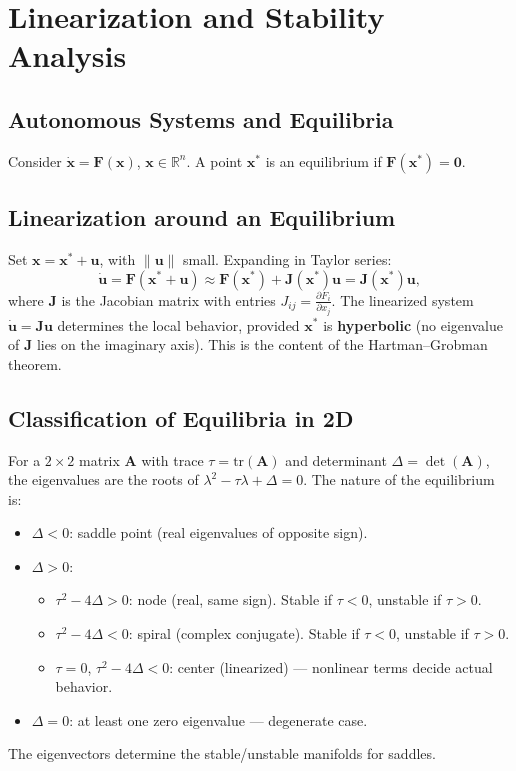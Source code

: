 \documentclass[12pt,a4paper]{book}
\begin{document}
\section{Linearization and Stability Analysis}

\subsection{Autonomous Systems and Equilibria}
Consider $\dot{\mathbf{x}} = \mathbf{F}(\mathbf{x})$, $\mathbf{x}\in\mathbb{R}^n$. A point $\mathbf{x}^*$ is an equilibrium if $\mathbf{F}(\mathbf{x}^*) = \mathbf{0}$.

\subsection{Linearization around an Equilibrium}
Set $\mathbf{x} = \mathbf{x}^* + \mathbf{u}$, with $\|\mathbf{u}\|$ small. Expanding in Taylor series:
\[
\dot{\mathbf{u}} = \mathbf{F}(\mathbf{x}^* + \mathbf{u}) \approx \mathbf{F}(\mathbf{x}^*) + \mathbf{J}(\mathbf{x}^*) \mathbf{u} = \mathbf{J}(\mathbf{x}^*) \mathbf{u},
\]
where $\mathbf{J}$ is the Jacobian matrix with entries $J_{ij} = \frac{\partial F_i}{\partial x_j}$. The linearized system $\dot{\mathbf{u}} = \mathbf{J}\mathbf{u}$ determines the local behavior, provided $\mathbf{x}^*$ is \textbf{hyperbolic} (no eigenvalue of $\mathbf{J}$ lies on the imaginary axis). This is the content of the Hartman–Grobman theorem.

\subsection{Classification of Equilibria in 2D}
For a $2\times2$ matrix $\mathbf{A}$ with trace $\tau = \text{tr}(\mathbf{A})$ and determinant $\Delta = \det(\mathbf{A})$, the eigenvalues are the roots of $\lambda^2 - \tau\lambda + \Delta = 0$. The nature of the equilibrium is:
\begin{itemize}
    \item $\Delta < 0$: saddle point (real eigenvalues of opposite sign).
    \item $\Delta > 0$:
    \begin{itemize}
        \item $\tau^2 - 4\Delta > 0$: node (real, same sign). Stable if $\tau<0$, unstable if $\tau>0$.
        \item $\tau^2 - 4\Delta < 0$: spiral (complex conjugate). Stable if $\tau<0$, unstable if $\tau>0$.
        \item $\tau = 0$, $\tau^2 - 4\Delta < 0$: center (linearized) — nonlinear terms decide actual behavior.
    \end{itemize}
    \item $\Delta = 0$: at least one zero eigenvalue — degenerate case.
\end{itemize}
The eigenvectors determine the stable/unstable manifolds for saddles.
\end{document}
